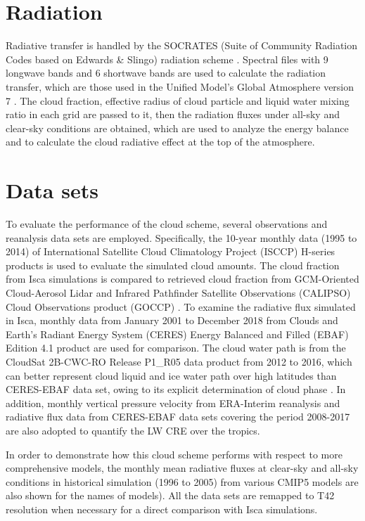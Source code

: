\section{Radiation}
\label{sec:radiation}

Radiative transfer is handled by the SOCRATES (Suite of Community Radiation Codes based on Edwards \& Slingo) radiation scheme \citep{Edwards1996, Manners2015}. Spectral files with 9 longwave bands and 6 shortwave bands are used to calculate the radiation transfer, which are those used in the Unified Model's Global Atmosphere version 7 \citep{Walters2019}. The cloud fraction, effective radius of cloud particle and liquid water mixing ratio in each grid are passed to it, then the radiation fluxes under all-sky and clear-sky conditions are obtained, which are used to analyze the energy balance and to calculate the cloud radiative effect \citep{Ramanathan1989, Li2017} at the top of the atmosphere. 



\section{Data sets}

To evaluate the performance of the cloud scheme, several observations and reanalysis data sets are employed. Specifically, the 10-year monthly data (1995 to 2014) of International Satellite Cloud Climatology Project (ISCCP) H-series products \citep{Young2018} is used to evaluate the simulated cloud amounts. The cloud fraction from Isca simulations is compared to retrieved cloud fraction from GCM-Oriented Cloud-Aerosol Lidar and Infrared Pathfinder Satellite Observations (CALIPSO) Cloud Observations product (GOCCP) \citep{Chepfer2010}. To examine the radiative flux simulated in Isca, monthly data from January 2001 to December 2018 from Clouds and Earth's Radiant Energy System (CERES) Energy Balanced and Filled (EBAF) Edition 4.1 product \citep[CERES-EBAF hereafter;][]{Loeb2018} are used for comparison. The cloud water path is from the CloudSat 2B-CWC-RO Release P1\_R05 data product \citep{Austin2009} from 2012 to 2016, which can better represent cloud liquid and ice water path over high latitudes than CERES-EBAF data set, owing to its explicit determination of cloud phase \citep{Lenaerts2017}. In addition, monthly vertical pressure velocity from ERA-Interim reanalysis and radiative flux data from CERES-EBAF data sets covering the period 2008-2017 are also adopted to quantify the LW CRE over the tropics.

In order to demonstrate how this cloud scheme performs with respect to more comprehensive models, the monthly mean radiative fluxes at clear-sky and all-sky conditions in historical simulation (1996 to 2005) from various CMIP5 models are also shown for the names of models). All the data sets are remapped to T42 resolution when necessary for a direct comparison with Isca simulations.
